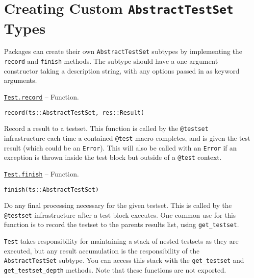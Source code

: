 \hypertarget{2880149133289869510}{}


\section{Creating Custom \texttt{AbstractTestSet} Types}



Packages can create their own \texttt{AbstractTestSet} subtypes by implementing the \texttt{record} and \texttt{finish} methods. The subtype should have a one-argument constructor taking a description string, with any options passed in as keyword arguments.


\hypertarget{5358474705981864018}{}
\hyperlink{5358474705981864018}{\texttt{Test.record}}  -- {Function.}

\begin{adjustwidth}{2em}{0pt}


\begin{verbatim}
record(ts::AbstractTestSet, res::Result)
\end{verbatim}

Record a result to a testset. This function is called by the \texttt{@testset} infrastructure each time a contained \texttt{@test} macro completes, and is given the test result (which could be an \texttt{Error}). This will also be called with an \texttt{Error} if an exception is thrown inside the test block but outside of a \texttt{@test} context.



\end{adjustwidth}
\hypertarget{3045207246411142824}{}
\hyperlink{3045207246411142824}{\texttt{Test.finish}}  -- {Function.}

\begin{adjustwidth}{2em}{0pt}


\begin{verbatim}
finish(ts::AbstractTestSet)
\end{verbatim}

Do any final processing necessary for the given testset. This is called by the \texttt{@testset} infrastructure after a test block executes. One common use for this function is to record the testset to the parent{\textquotesingle}s results list, using \texttt{get\_testset}.



\end{adjustwidth}

\texttt{Test} takes responsibility for maintaining a stack of nested testsets as they are executed, but any result accumulation is the responsibility of the \texttt{AbstractTestSet} subtype. You can access this stack with the \texttt{get\_testset} and \texttt{get\_testset\_depth} methods. Note that these functions are not exported.


